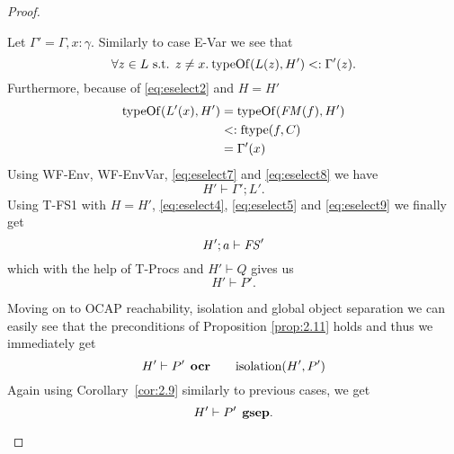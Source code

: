 \begin{proof}
\begin{description}
\begin{description}
\begin{description}
\begin{equation}
              \end{equation}
              Let $\Gamma' = \Gamma, x: \gamma$. Similarly to case {\sc E-Var}
              we see that
              \begin{equation} \label{eq:eselect7}
                \forall z \in L \text{ s.t. } z \neq x . \: \mbox{$\mathrm{typeOf}$}(L(z), H')
                <: \Gamma'(z).
              \end{equation}
              Furthermore, because of \eqref{eq:eselect2} and $H = H'$
              \begin{equation} \label{eq:eselect8}
                \begin{aligned}
                  \mbox{$\mathrm{typeOf}$}(L'(x), H') &= \mbox{$\mathrm{typeOf}$}(\mathit{FM}(f), H') \\
                                     &<: \mbox{$\mathrm{ftype}$}(f, C) \\
                                     &= \Gamma'(x)
                \end{aligned}
              \end{equation}
              Using {\sc WF-Env, WF-EnvVar}, \eqref{eq:eselect7} and
              \eqref{eq:eselect8} we have
              \begin{equation} \label{eq:eselect9}
                H' \vdash \Gamma';L'.
              \end{equation}
              Using {\sc T-FS1} with $H = H'$, \eqref{eq:eselect4}, \eqref{eq:eselect5}
              and \eqref{eq:eselect9} we finally get
              \begin{equation}
                H';a \vdash \mathit{FS}'
              \end{equation}
              which with the help of {\sc T-Procs} and $H' \vdash Q$ gives us 
              \begin{equation*}
                H'\vdash P'.
              \end{equation*}
              
              Moving on to OCAP reachability, isolation and global object
              separation we can easily see that the preconditions of Proposition
              \ref{prop:2.11} holds and thus we immediately get
              \begin{equation*}
                H' \vdash P' \:\: \mbox{\bf ocr} \quad\quad \mbox{$\mathrm{isolation}$}(H', P')
              \end{equation*}
              Again using Corollary~\ref{cor:2.9} similarly to previous cases, we get
              \begin{equation*}
                H' \vdash P' \:\: \mbox{\bf gsep}.
              \end{equation*}



\end{description}
\end{description}
\end{description}
\end{proof}
